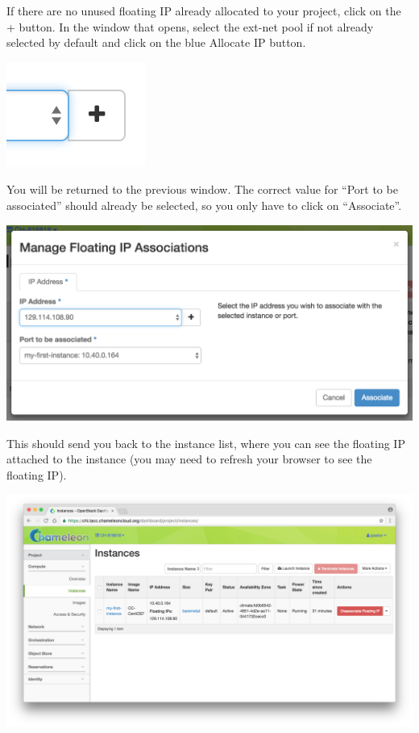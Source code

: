 If there are no unused floating IP already allocated to your project,
click on the + button. In the window that opens, select the ext-net pool
if not already selected by default and click on the blue Allocate IP
button.

\includegraphics[width=\columnwidth]{images/chameleon/Screen-Shot-2016-10-26-at-16-33-45-W05kOLQ.png}

You will be returned to the previous window. The correct value for
``Port to be associated'' should already be selected, so you only have
to click on ``Associate''.

\includegraphics[width=\columnwidth]{images/chameleon/Screen-Shot-2016-10-26-at-16-25-10.png}

This should send you back to the instance list, where you can see the
floating IP attached to the instance (you may need to refresh your
browser to see the floating IP).

\includegraphics[width=\columnwidth]{images/chameleon/Screen-Shot-2016-10-26-at-16-26-54.png}

